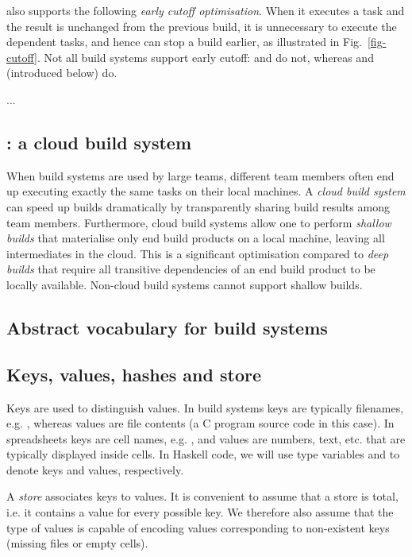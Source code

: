 \Shake also supports the following \emph{early cutoff optimisation}. When it
executes a task and the result is unchanged from the previous build, it is
unnecessary to execute the dependent tasks, and hence \Shake can stop a build
earlier, as illustrated in Fig.~\ref{fig-cutoff}. Not all build systems support
early cutoff: \Make and \Excel do not, whereas \Shake and \Bazel (introduced
below) do.

...

\subsection{\Bazel: a cloud build system}
\label{sec-background-shake}

When build systems are used by large teams, different team members
often end up executing exactly the same tasks on their local machines.
A \emph{cloud build system} can speed up builds dramatically by
transparently sharing build results among team members. Furthermore, cloud
build systems allow one to perform \emph{shallow builds} that materialise
only end build products on a local machine, leaving all intermediates in the
cloud. This is a significant optimisation compared to \emph{deep builds}
that require all transitive dependencies of an end build product to be
locally available. Non-cloud build systems cannot support shallow builds.

\subsection{Abstract vocabulary for build systems}
\label{sec-background-vocabulary}

\subsection{Keys, values, hashes and store}

Keys are
used to distinguish values. In build systems keys are typically filenames, e.g.
, whereas values are file contents (a C program source code in this
case). In spreadsheets keys are cell names, e.g. , and values are
numbers, text, etc. that are typically displayed inside cells. In Haskell code,
we will use type variables  and  to denote keys and values,
respectively.


A \emph{store} associates keys to values. It is convenient to assume that a store
is total, i.e. it contains a value for every possible key. We therefore also
assume that the type of values is capable of encoding values corresponding to
non-existent keys (missing files or empty cells).


